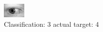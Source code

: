 \begin{figure}[h!]
\begin{center}
\includegraphics[width=0.60\columnwidth]{figures/ID758_class_3_target_4.png}
\end{center}
\caption{ Classification: 3 actual target: 4}
\label{fig:ID758_class_3_target_4}
\end{figure}
